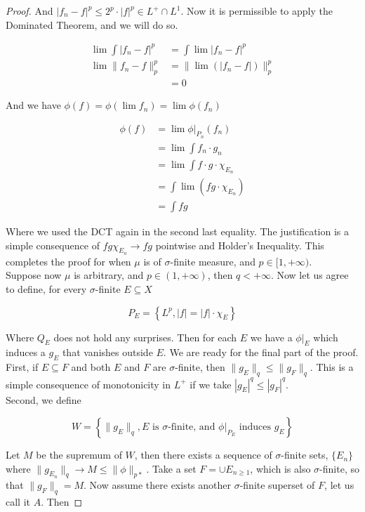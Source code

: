 \documentclass[../../main.tex]{subfiles}
\begin{document}
\begin{proof}
And $|f_n -f|^p \leq 2^p\cdot |f|^p \in L^+\cap L^1$. Now it is permissible to apply the Dominated Theorem, and we will do so.

\begin{align*}
    \lim \int |f_n -f|^p &= \int \lim |f_n-f|^p\\
    \lim \lVert f_n -f \rVert^p_p &= \lVert \lim (|f_n - f|) \rVert^p_p\\
    &= 0
\end{align*}

And we have $\phi(f) = \phi(\lim f_n) = \lim\phi(f_n)$

\begin{align*}
    \phi(f) &= \lim \phi|_{P_n}(f_n)\\
    &= \lim \int f_n\cdot g_n\\
    &= \lim \int f\cdot g\cdot\chi_{E_n}\\
    &= \int \lim\left(fg\cdot\chi_{E_n}\right)\\
    &= \int fg
\end{align*}

Where we used the DCT again in the second last equality. The justification is a simple consequence of $fg\chi_{E_n}\to fg$ pointwise and Holder's Inequality. This completes the proof for when $\mu$ is of $\sigma$-finite measure, and $p\in[1,+\infty)$.\\

Suppose now $\mu$ is arbitrary, and $p\in(1,+\infty)$, then $q<+\infty$. Now let us agree to define, for every $\sigma$-finite $E\subseteq X$

\[
P_E = \left\{L^p, |f| = |f|\cdot\chi_E\right\}
\]

Where $Q_E$ does not hold any surprises. Then for each $E$ we have a $\phi|_E$ which induces a $g_E$ that vanishes outside $E$. We are ready for the final part of the proof.\\

First, if $E\subseteq F$ and both $E$ and $F$ are $\sigma$-finite, then $\lVert g_E\rVert_q \leq \lVert g_F\rVert_q$. This is a simple consequence of monotonicity in $L^+$ if we take $|g_E|^q\leq |g_F|^q$.\\ 

Second, we define

\[
W = \left\{\lVert g_E\rVert_q, E \text{ is } \sigma \text{-finite, and }\phi|_{P_E} \text{ induces } g_E\right\}
\]

Let $M$ be the supremum of $W$, then there exists a sequence of $\sigma$-finite sets, $\{E_n\}$ where $\lVert g_{E_n}\rVert_q \to M\leq \lVert \phi \rVert_{p*}$. Take a set $F = \cup E_{n\geq 1}$, which is also $\sigma$-finite, so that $\lVert g_F \rVert_q = M$. Now assume there exists another $\sigma$-finite superset of $F$, let us call it $A$. Then 


\end{proof}
\end{document}
